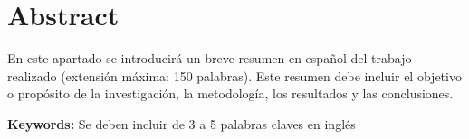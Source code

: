 \chapter{Abstract}

En este apartado se introducirá un breve resumen en español del trabajo realizado (extensión máxima: 150 palabras). Este resumen debe incluir el objetivo o propósito de la investigación, la metodología, los resultados y las conclusiones.

{\bf Keywords:} Se deben incluir de 3 a 5 palabras claves en inglés